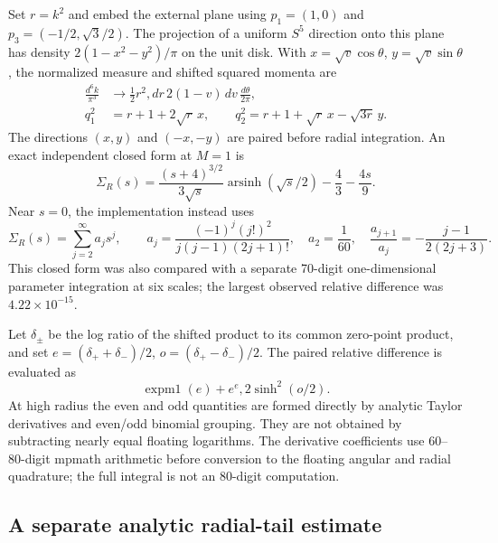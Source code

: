 Set $r=k^2$ and embed the external plane using
$p_1=(1,0)$ and $p_3=(-1/2,\sqrt3/2)$.  The projection of a uniform $S^5$
direction onto this plane has density
$2(1-x^2-y^2)/\pi$ on the unit disk.  With
$x=\sqrt v\cos\theta$, $y=\sqrt v\sin\theta$, the normalized measure and
shifted squared momenta are
\begin{align}
 \frac{d^6k}{\pi^3}
 &\longrightarrow\frac12 r^2,dr\,2(1-v)\,dv\,
                     \frac{d\theta}{2\pi},\\
 q_1^2&=r+1+2\sqrt r\,x,\qquad
 q_2^2=r+1+\sqrt r\,x-\sqrt{3r}\,y.
 \label{eq:four-independent-measure}
\end{align}
The directions $(x,y)$ and $(-x,-y)$ are paired before radial integration.
An exact independent closed form at $M=1$ is
\begin{equation}
 \Sigma_R(s)=\frac{(s+4)^{3/2}}{3\sqrt s}
       \operatorname{arsinh}(\sqrt s/2)-\frac43-\frac{4s}{9}.
 \label{eq:four-independent-bubble-closed}
\end{equation}
Near $s=0$, the implementation instead uses
\begin{equation}
 \Sigma_R(s)=\sum_{j=2}^{\infty}a_js^j,\qquad
 a_j=\frac{(-1)^j(j!)^2}{j(j-1)(2j+1)!},\quad
 a_2=\frac1{60},\quad
 \frac{a_{j+1}}{a_j}=-\frac{j-1}{2(2j+3)}.
\end{equation}
This closed form was also compared with a separate 70-digit
one-dimensional parameter integration at six scales; the largest observed
relative difference was $4.22\times10^{-15}$.

Let $\delta_\pm$ be the log ratio of the shifted product to its common
zero-point product, and set
$e=(\delta_++\delta_-)/2$, $o=(\delta_+-\delta_-)/2$.  The paired relative
difference is evaluated as
\begin{equation}
 \operatorname{expm1}(e)
       +e^e,2\sinh^2(o/2).
 \label{eq:four-independent-evenodd}
\end{equation}
At high radius the even and odd quantities are formed directly by analytic
Taylor derivatives and even/odd binomial grouping.  They are not obtained
by subtracting nearly equal floating logarithms.  The derivative
coefficients use 60--80-digit mpmath arithmetic before conversion to the
floating angular and radial quadrature; the full integral is not an
80-digit computation.

\subsection{A separate analytic radial-tail estimate}

